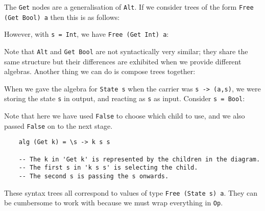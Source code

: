 \documentclass[a4paper,12pt]{article}
\theoremstyle{remark}
\begin{document}
The \lstinline{Get} nodes are a generalisation of \lstinline{Alt}. If we consider
trees of the form \lstinline{Free (Get Bool) a} then this is as follows:

\begin{figure}[H]
  \centering
\end{figure}

However, with \lstinline{s = Int}, we have \lstinline{Free (Get Int) a}:

\begin{figure}[H]
  \centering
\end{figure}

Note that \lstinline{Alt} and \lstinline{Get Bool} are not syntactically very
similar; they share the same structure but their differences are exhibited when
we provide different algebras. Another thing we can do is compose trees together:

\begin{figure}[H]
  \centering
\end{figure}

When we gave the algebra for \lstinline{State s} when the carrier was \lstinline{s -> (a,s)},
we were storing the state \lstinline{s} in output, and reacting as \lstinline{s}
as input. Consider \lstinline{s = Bool}:

\begin{figure}[H]
  \centering
\end{figure}

Note that here we have used \lstinline{False} to choose which child to use, and
we also passed \lstinline{False} on to the next stage.

\begin{lstlisting}
    alg (Get k) = \s -> k s s

    -- The k in 'Get k' is represented by the children in the diagram.
    -- The first s in 'k s s' is selecting the child.
    -- The second s is passing the s onwards.  \end{lstlisting}

These syntax trees all correspond to values of type \lstinline{Free (State s) a}.
They can be cumbersome to work with because we must wrap everything in \lstinline{Op}.
\end{document}

